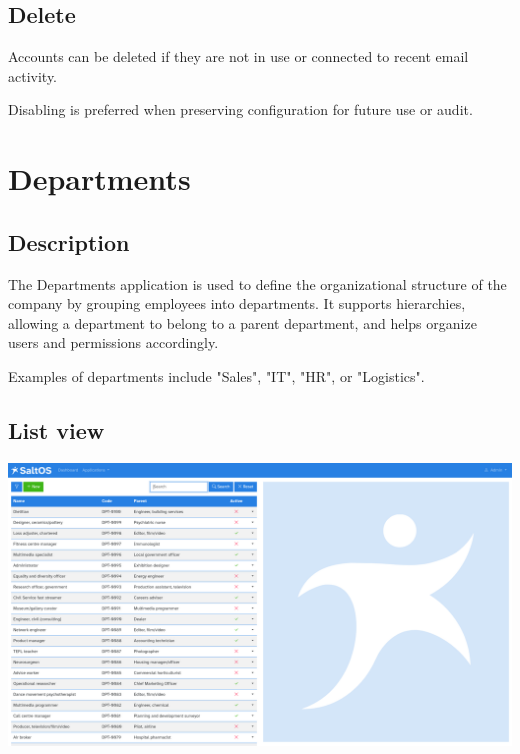 \documentclass[a4paper]{article}
\begin{document}
\hypertarget{toc100}{}
\subsection{Delete}

Accounts can be deleted if they are not in use or connected to recent email activity.

Disabling is preferred when preserving configuration for future use or audit.


\hypertarget{toc101}{}
\section{Departments}

\hypertarget{toc102}{}
\subsection{Description}

The Departments application is used to define the organizational structure of the company by grouping employees into departments.
It supports hierarchies, allowing a department to belong to a parent department, and helps organize users and permissions accordingly.

Examples of departments include "Sales", "IT", "HR", or "Logistics".

\hypertarget{toc103}{}
\subsection{List view}

\begin{center}\includegraphics[width=1\textwidth]{../ujest/snaps/test-screenshots-js-screenshots-hr-departments-list-en-us-1-snap.png}\end{center}
\end{document}
